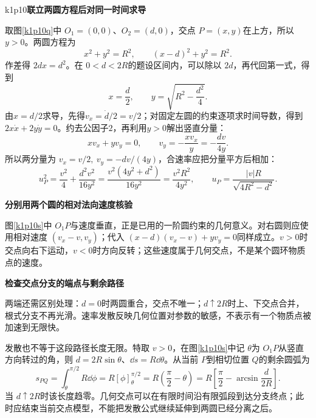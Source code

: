 \begin{drillsolution}{k1p10}\textbf{联立两圆方程后对同一时间求导}\par\nobreak
取图\ref{k1p10q}中 $O_1=(0,0)$、$O_2=(d,0)$，交点 $P=(x,y)$在上方，所以 $y>0$。两圆方程为
\[x^2+y^2=R^2,\qquad (x-d)^2+y^2=R^2.\]
作差得 $2dx=d^2$。在 $0<d<2R$的题设区间内，可以除以 $2d$，再代回第一式，得到
\[x=\frac d2,\qquad y=\sqrt{R^2-\frac{d^2}4}.\]
由$x=d/2$求导，先得$v_x=\dot d/2=v/2$；对固定左圆的约束逐项求时间导数，得到$2x\dot x+2y\dot y=0$。约去公因子$2$，再利用$y>0$解出竖直分量：
\[xv_x+yv_y=0,\qquad
v_y=-\frac{xv_x}{y}=-\frac{dv}{4y}.\]
所以两分量为 $\boxed{v_x=v/2,\ v_y=-dv/(4y)}$，合速率应把分量平方后相加：
\[u_P^2=\frac{v^2}{4}+\frac{d^2v^2}{16y^2}
 =\frac{v^2(4y^2+d^2)}{16y^2}
 =\frac{v^2R^2}{4y^2},\qquad
\boxed{u_P=\frac{|v|R}{\sqrt{4R^2-d^2}}}.\]



\par\medskip{}\noindent\textbf{分别用两个圆的相对法向速度核验}\par\nobreak
图\ref{k1p10s}中 $O_1P$与速度垂直，正是已用的一阶圆约束的几何意义。对右圆则应使用相对速度 $(v_x-v,v_y)$；代入 $(x-d)(v_x-v)+yv_y=0$同样成立。$v>0$时交点向右下运动，$v<0$时方向反转；这些速度属于几何交点，不是某个圆环物质点的速度。


\par\medskip{}\noindent\textbf{检查交点分支的端点与剩余路径}\par\nobreak
两端还需区别处理：$d=0$时两圆重合，交点不唯一；$d\uparrow2R$时上、下交点合并，根式分支不再光滑。速率发散反映几何位置对参数的敏感，不表示有一个物质点被加速到无限快。

发散也不等于这段路径长度无限。特取 $v>0$，在图\ref{k1p10s}中记 $\theta$为 $O_1P$从竖直方向转过的角，则 $d=2R\sin\theta$、$\dd s=R\dd\theta$。从当前 $P$到相切位置 $Q$的剩余圆弧为
\[
s_{PQ}=\int_\theta^{\pi/2}R\dd\phi
=R[\phi]_\theta^{\pi/2}=R\left(\frac\pi2-\theta\right)
=R\left[\frac\pi2-\arcsin\frac d{2R}\right].
\]
当 $d\uparrow2R$时该长度趋零。几何交点可以在有限时间沿有限弧段到达分支终点；此时应结束当前交点模型，不能把发散公式继续延伸到两圆已经分离之后。
\end{drillsolution}

